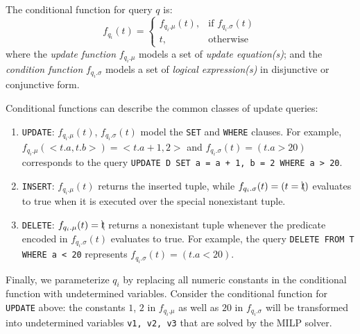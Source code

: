   \begin{definition} 
  \label{def:cond}
    The conditional function for query $q$ is:
    \[
      f_{q_i}(t)= 
      \begin{cases}
      f_{q_i.\mu} (t) ,& \text{if } f_{q_i.\sigma} (t)\\
      t,              & \text{otherwise}
      \end{cases}
  \]
  where the \textit{update function} $f_{q_i.\mu}$ models a set of \textit{update equation(s)};
  and the \textit{condition function} $f_{q_i.\sigma}$ models a set of \textit{logical expression(s)} in 
  disjunctive or conjunctive form.
  \end{definition} 



  Conditional functions can describe the common classes of update queries:
  \begin{enumerate}
  \item \texttt{UPDATE}: $f_{q_i.\mu}(t)$, $f_{q_i.\sigma}(t)$ model the \texttt{SET}
        and \texttt{WHERE} clauses.  For example, $f_{q_i.\mu}(<t.a, t.b>) = <t.a + 1, 2>$ and
        $f_{q_i.\sigma}(t) = (t.a > 20)$ corresponds to the query 
        \texttt{UPDATE D SET a = a + 1, b = 2 WHERE a > 20}.

  \item \texttt{INSERT}: $f_{q_i.\mu}(t)$ returns the inserted tuple, while 
        $f_{q_i.\sigma}(t) = (t = \bcancel{t})$ evaluates to true when it is executed over
        the special nonexistant tuple.

  \item \texttt{DELETE}: $f_{q_i.\mu}(t) = \bcancel{t}$ returns a nonexistant tuple whenever
        the predicate encoded in $f_{q_i.\sigma}(t)$ evaluates to true.
        For example, the query \texttt{DELETE FROM T WHERE a < 20} represents 
        $f_{q_i.\sigma}(t) = (t.a < 20)$.
        
  \end{enumerate}

  Finally, we parameterize $q_i$ by replacing all numeric constants in the
  conditional function with undetermined variables.   Consider the conditional
  function for \texttt{UPDATE} above: the constants $1$, $2$ in $f_{q_i.\mu}$
  as well as $20$ in $f_{q_i.\sigma}$ will be transformed into undetermined
  variables \texttt{v1, v2, v3} that are solved by the MILP solver.

\fi




